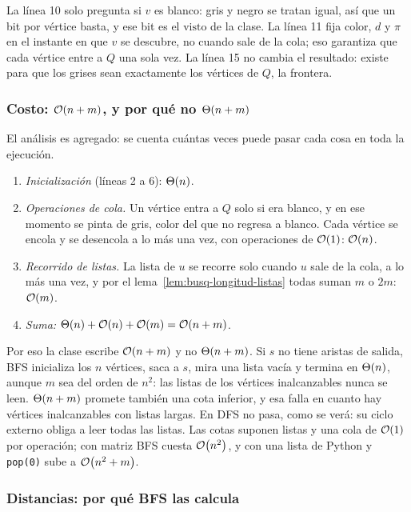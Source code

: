 \documentclass[11pt,letterpaper]{article}
\begin{document}
La línea 10 solo pregunta si $v$ es blanco: gris y negro se tratan
igual, así que un bit por vértice basta, y ese bit es el
$\text{visto}$ de la clase. La línea 11 fija color, $d$ y $\pi$ en el
instante en que $v$ se descubre, no cuando sale de la cola; eso
garantiza que cada vértice entre a $Q$ una sola vez. La línea 15 no
cambia el resultado: existe para que los grises sean exactamente los
vértices de $Q$, la frontera.

\subsubsection*{Costo: $\mathcal{O}\!\left(n + m\right)$, y por qué no $\Theta\!\left(n + m\right)$}

El análisis es agregado: se cuenta cuántas veces puede pasar cada cosa
en toda la ejecución.
\begin{enumerate}[itemsep=0.15em]
  \item \textit{Inicialización} (líneas 2 a 6): $\Theta\!\left(n\right)$.
  \item \textit{Operaciones de cola.} Un vértice entra a $Q$ solo si
    era blanco, y en ese momento se pinta de gris, color del que no
    regresa a blanco. Cada vértice se encola y se desencola a lo más
    una vez, con operaciones de $\mathcal{O}\!\left(1\right)$: $\mathcal{O}\!\left(n\right)$.
  \item \textit{Recorrido de listas.} La lista de $u$ se recorre solo
    cuando $u$ sale de la cola, a lo más una vez, y por el
    lema~\ref{lem:busq-longitud-listas} todas suman $m$ o $2m$:
    $\mathcal{O}\!\left(m\right)$.
  \item \textit{Suma:} $\Theta\!\left(n\right) + \mathcal{O}\!\left(n\right) + \mathcal{O}\!\left(m\right) = \mathcal{O}\!\left(n + m\right)$.
\end{enumerate}

Por eso la clase escribe $\mathcal{O}\!\left(n + m\right)$ y no $\Theta\!\left(n + m\right)$. Si $s$ no
tiene aristas de salida, BFS inicializa los $n$ vértices, saca a $s$,
mira una lista vacía y termina en $\Theta\!\left(n\right)$, aunque $m$ sea del orden
de $n^2$: las listas de los vértices inalcanzables nunca se leen.
$\Theta\!\left(n + m\right)$ promete también una cota inferior, y esa falla en cuanto
hay vértices inalcanzables con listas largas. En DFS no pasa, como se
verá: su ciclo externo obliga a leer todas las listas. Las cotas
suponen listas y una cola de $\mathcal{O}\!\left(1\right)$ por operación; con matriz BFS
cuesta $\mathcal{O}\!\left(n^2\right)$, y con una lista de Python y \texttt{pop(0)} sube
a $\mathcal{O}\!\left(n^2 + m\right)$.

\subsubsection*{Distancias: por qué BFS las calcula}
\end{document}
